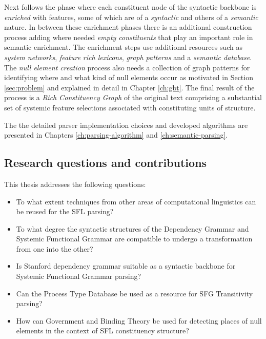 Next follows the phase where each constituent node of the syntactic backbone is \textit{enriched} with features, some of which are of a \textit{syntactic} and others of a \textit{semantic} nature. In between these enrichment phases there is an additional construction process adding where needed \textit{empty constituents} that play an important role in semantic enrichment. The enrichment steps use additional resources such as \textit{system networks}, \textit{feature rich lexicons}, \textit{graph patterns} and a \textit{semantic database}. The \textit{null element creation} process also needs a collection of graph patterns for identifying where and what kind of null elements occur as motivated in Section \ref{sec:problem} and explained in detail in Chapter \ref{ch:gbt}. The final result of the process is a \textit{Rich Constituency Graph} of the original text comprising a substantial set of systemic feature selections associated with constituting units of structure. 

The the detailed parser implementation choices and developed algorithms are presented in Chapters \ref{ch:parsing-algorithm} and \ref{ch:semantic-parsing}.

\subsection{Research questions and contributions} %
This thesis addresses the following questions:
\begin{itemize}
    \item To what extent techniques from other areas of computational linguistics can be reused for the SFL parsing? 
    \item To what degree the syntactic structures of the Dependency Grammar and Systemic Functional Grammar are compatible to undergo a transformation from one into the other?
    \item Is Stanford dependency grammar suitable as a syntactic backbone for Systemic Functional Grammar parsing?
    
    \item Can the Process Type Database be used as a resource for SFG Transitivity parsing?
    \item How can Government and Binding Theory be used for detecting places of null elements in the context of SFL constituency structure?
    
\end{itemize}

